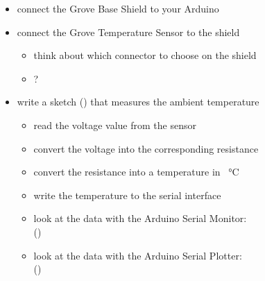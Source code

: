 \begin{itemize}
	\item connect the Grove Base Shield to your Arduino
	\item connect the Grove Temperature Sensor to the shield
	\begin{itemize}
		\item think about which connector to choose on the shield
		\item {}?
	\end{itemize}
	\item write a sketch () that measures the ambient temperature
	\begin{itemize}
		\item read the voltage value from the sensor
		\item convert the voltage into the corresponding resistance
		\item convert the resistance into a temperature in \SI{}{\degreeCelsius}
		\item write the temperature to the serial interface
		\item look at the data with the Arduino Serial Monitor:\\  ()
		\item look at the data with the Arduino Serial Plotter:\\  ()
	\end{itemize}
\end{itemize}



